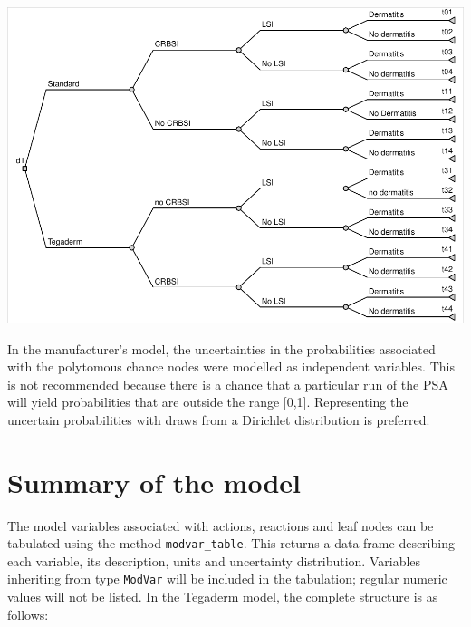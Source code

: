 \documentclass[
]{article}
\begin{document}
\begin{center}\includegraphics{DT02-Tegaderm_files/figure-latex/draw-1} \end{center}

In the manufacturer's model, the uncertainties in the probabilities
associated with the polytomous chance nodes were modelled as independent
variables. This is not recommended because there is a chance that a
particular run of the PSA will yield probabilities that are outside the
range {[}0,1{]}. Representing the uncertain probabilities with draws
from a Dirichlet distribution is preferred.

\hypertarget{summary-of-the-model}{%
\section{Summary of the model}\label{summary-of-the-model}}

The model variables associated with actions, reactions and leaf nodes
can be tabulated using the method \texttt{modvar\_table}. This returns a
data frame describing each variable, its description, units and
uncertainty distribution. Variables inheriting from type \texttt{ModVar}
will be included in the tabulation; regular numeric values will not be
listed. In the Tegaderm model, the complete structure is as follows:
\end{document}
